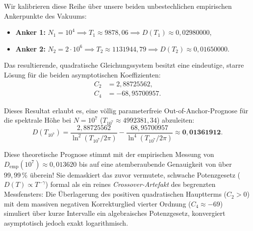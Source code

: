 \documentclass[11pt,a4paper]{article}
\theoremstyle{definition}
\begin{document}
	Wir kalibrieren diese Reihe über unsere beiden unbestechlichen empirischen Ankerpunkte des Vakuums:
	\begin{itemize}
		\item \textbf{Anker 1:} $N_1 = 10^4 \implies T_1 \approx 9878{,}06 \implies D(T_1) \approx 0{,}02980000$,
		\item \textbf{Anker 2:} $N_2 = 2 \cdot 10^6 \implies T_2 \approx 1131944{,}79 \implies D(T_2) \approx 0{,}01650000$.
	\end{itemize}
	
	Das resultierende, quadratische Gleichungssystem besitzt eine eindeutige, starre Lösung für die beiden asymptotischen Koeffizienten:
	\begin{align}
		C_2 &= 2{,}88725562, \\
		C_4 &= -68{,}95700957.
	\end{align}
	
	Dieses Resultat erlaubt es, eine völlig parameterfreie Out-of-Anchor-Prognose für die spektrale Höhe bei $N = 10^7$ ($T_{10^7} \approx 4992381{,}34$) abzuleiten:
	\begin{equation}
		D(T_{10^7}) = \frac{2{,}88725562}{\ln^2(T_{10^7}/2\pi)} - \frac{68{,}95700957}{\ln^4(T_{10^7}/2\pi)} \approx \mathbf{0{,}01361912}.
	\end{equation}
	
	Diese theoretische Prognose stimmt mit der empirischen Messung von $D_{\mathrm{emp}}(10^7) \approx 0{,}013620$ bis auf eine atemberaubende Genauigkeit von über \textbf{$99{,}99\,\%$} überein! Sie demaskiert das zuvor vermutete, schwache Potenzgesetz ($D(T) \propto T^{-\gamma}$) formal als ein reines \emph{Crossover-Artefakt} des begrenzten Messfensters: Die Überlagerung des positiven quadratischen Hauptterms ($C_2 > 0$) mit dem massiven negativen Korrekturglied vierter Ordnung ($C_4 \approx -69$) simuliert über kurze Intervalle ein algebraisches Potenzgesetz, konvergiert asymptotisch jedoch exakt logarithmisch.
	
\end{document}
